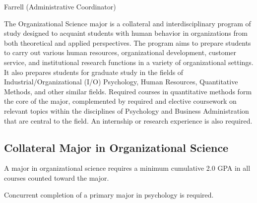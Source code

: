 \documentclass[
  letterpaper,
]{scrbook}
\begin{document}
Farrell (Administrative Coordinator)

The Organizational Science major is a collateral and interdisciplinary
program of study designed to acquaint students with human behavior in
organizations from both theoretical and applied perspectives. The
program aims to prepare students to carry out various human resources,
organizational development, customer service, and institutional research
functions in a variety of organizational settings. It also prepares
students for graduate study in the fields of Industrial/Organizational
(I/O) Psychology, Human Resources, Quantitative Methods, and other
similar fields. Required courses in quantitative methods form the core
of the major, complemented by required and elective coursework on
relevant topics within the disciplines of Psychology and Business
Administration that are central to the field. An internship or research
experience is also required.

\subsection{Collateral Major in Organizational
Science}\label{collateral-major-in-organizational-science}

A major in organizational science requires a minimum cumulative 2.0 GPA
in all courses counted toward the major.

Concurrent completion of a primary major in psychology is required.
\end{document}
